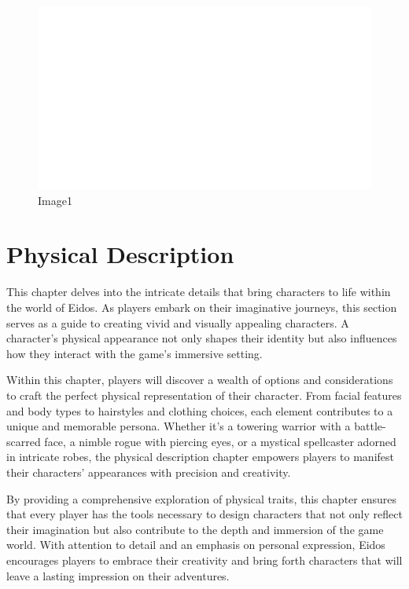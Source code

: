 \begin{figure}
\centering
\includegraphics{./images/religion06.svg}
\caption{Image1}
\end{figure}

\hypertarget{physical-description}{%
\section{Physical Description}\label{physical-description}}

This chapter delves into the intricate details that bring characters to
life within the world of Eidos. As players embark on their imaginative
journeys, this section serves as a guide to creating vivid and visually
appealing characters. A character's physical appearance not only shapes
their identity but also influences how they interact with the game's
immersive setting.

Within this chapter, players will discover a wealth of options and
considerations to craft the perfect physical representation of their
character. From facial features and body types to hairstyles and
clothing choices, each element contributes to a unique and memorable
persona. Whether it's a towering warrior with a battle-scarred face, a
nimble rogue with piercing eyes, or a mystical spellcaster adorned in
intricate robes, the physical description chapter empowers players to
manifest their characters' appearances with precision and creativity.

By providing a comprehensive exploration of physical traits, this
chapter ensures that every player has the tools necessary to design
characters that not only reflect their imagination but also contribute
to the depth and immersion of the game world. With attention to detail
and an emphasis on personal expression, Eidos encourages players to
embrace their creativity and bring forth characters that will leave a
lasting impression on their adventures.

